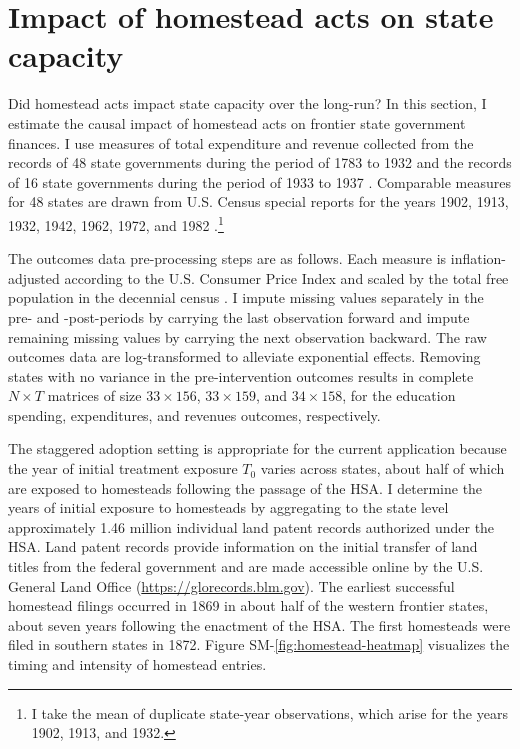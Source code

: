 \documentclass[12pt]{article}
\begin{document}
\section{Impact of homestead acts on state capacity} \label{state-capacity}

Did homestead acts impact state capacity over the long-run? In this section, I estimate the causal impact of homestead acts on frontier state government finances. I use measures of total expenditure and revenue collected from the records of 48 state governments during the period of 1783 to 1932 \citep{sylla1993sources} and the records of 16 state governments during the period of 1933 to 1937 \citep{sylla1995sourcesa,sylla1995sourcesb}. Comparable measures for 48 states are drawn from U.S. Census special reports for the years 1902, 1913, 1932, 1942, 1962, 1972, and 1982 \citep{haines2010}.\footnote{I take the mean of duplicate state-year observations, which arise for the years 1902, 1913, and 1932.}%

The outcomes data pre-processing steps are as follows. Each measure is inflation-adjusted according to the U.S. Consumer Price Index \citep{williamson2017seven} and scaled by the total free population in the decennial census \citep{haines2010}. I impute missing values separately in the pre- and -post-periods by carrying the last observation forward and impute remaining missing values by carrying the next observation backward. The raw outcomes data are log-transformed to alleviate exponential effects. Removing states with no variance in the pre-intervention outcomes results in complete $N \times T$ matrices of size $33 \times 156$, $33 \times 159$, and $34 \times 158$, for the education spending, expenditures, and revenues outcomes, respectively. 

The staggered adoption setting is appropriate for the current application because the year of initial treatment exposure $T_0$ varies across states, about half of which are exposed to homesteads following the passage of the HSA. I determine the years of initial exposure to homesteads by aggregating to the state level approximately 1.46 million individual land patent records authorized under the HSA. Land patent records provide information on the initial transfer of land titles from the federal government and are made accessible online by the U.S. General Land Office (\url{https://glorecords.blm.gov}). The earliest successful homestead filings occurred in 1869 in about half of the western frontier states, about seven years following the enactment of the HSA. The first homesteads were filed in southern states in 1872. Figure SM-\ref{fig:homestead-heatmap} visualizes the timing and intensity of homestead entries. 
\end{document}
